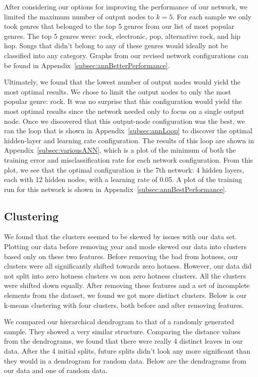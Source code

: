 \documentclass[12pt]{article}
\begin{document}
After considering our options for improving the performance of our network, we limited the maximum number of output nodes to $k = 5$. For each sample we only took genres that belonged to the top 5 genres from our list of most popular genres. The top 5 genres were: rock, electronic, pop, alternative rock, and hip hop. Songs that didn't belong to any of these genres would ideally not be classified into any category. Graphs from our revised network configurations can be found in Appendix~\ref{subsec:annBetterPerformance}.

Ultimately, we found that the lowest number of output nodes would yield the most optimal results. We chose to limit the output nodes to only the most popular genre: rock. It was no surprise that this configuration would yield the most optimal results since the network needed only to focus on a single output node. Once we discovered that this output-node configuration was the best, we ran the loop that is shown in Appendix~\ref{subsec:annLoop} to discover the optimal hidden-layer and learning rate configuration. The results of this loop are shown in Appendix~\ref{subsec:variousANN}, which is a plot of the minimum of both the training error and misclassification rate for each network configuration. From this plot, we see that the optimal configuration is the 7th network: 4 hidden layers, each with 12 hidden nodes, with a learning rate of 0.05. A plot of the training run for this network is shown in Appendix~\ref{subsec:annBestPerformance}.


\subsection{Clustering}
\label{subsec:clusteringResults}
We found that the clusters seemed to be skewed by issues with our data set. Plotting our data before removing year and mode skewed our data into clusters based only on these two features. Before removing the bad from hotness, our clusters were all significantly shifted towards zero hotness. However, our data did not split into zero hotness clusters vs non zero hotness clusters. All the clusters were shifted down equally. After removing these features and a set of incomplete elements from the dataset, we found we got more distinct clusters. Below is our k-means clustering with four clusters, both before and after removing features.


We compared our hierarchical dendrogram to that of a randomly generated sample. They showed a very similar structure. Comparing the distance values from the dendrograms, we found that there were really 4 distinct leaves in our data. After the 4 initial splits, future splits didn't look any more significant than they would in a dendrogram for random data. Below are the dendragrams from our data and one of random data.
\end{document}
